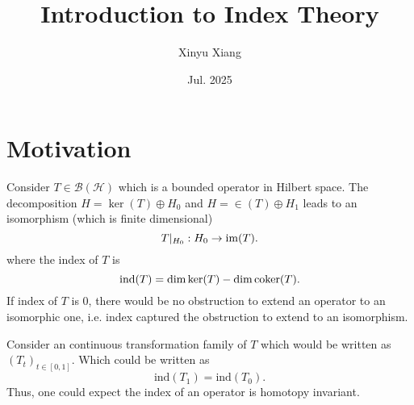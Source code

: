 \documentclass[10pt]{article}
\title{\textbf{Introduction to Index Theory}}
\author{Xinyu Xiang}
\date{Jul. 2025}
\begin{document}
\maketitle

\section{Motivation}

Consider $ T \in \mathcal{B}(\mathcal{H})$ which is a bounded operator in Hilbert space. The decomposition $ H = \ker(T) \oplus H_0$ and $ H = \in(T) \oplus H_1$ leads to an isomorphism (which is finite dimensional)
\begin{equation*}
  T |_{H_0 } : H_0 \rightarrow \operatorname{im}(T).
\end{equation*}
where the index of $ T$ is
\begin{equation*}
  \mathrm{ind}(T) = \dim \ker (T) - \dim \operatorname{coker} (T).
\end{equation*}
If index of $ T$ is $ 0 $, there would be no obstruction to extend an operator to an isomorphic one, i.e. index captured the obstruction to extend to an isomorphism.

Consider an continuous transformation family of $ T$ which would be written as $ \left( T_{t} \right)_{t \in [0,1]} $. Which could be written as
\begin{equation*}
  \mathrm{ind}(T_{1}) = \mathrm{ind}(T_0).
\end{equation*}
Thus, one could expect the index of an operator is homotopy invariant.
\end{document}
